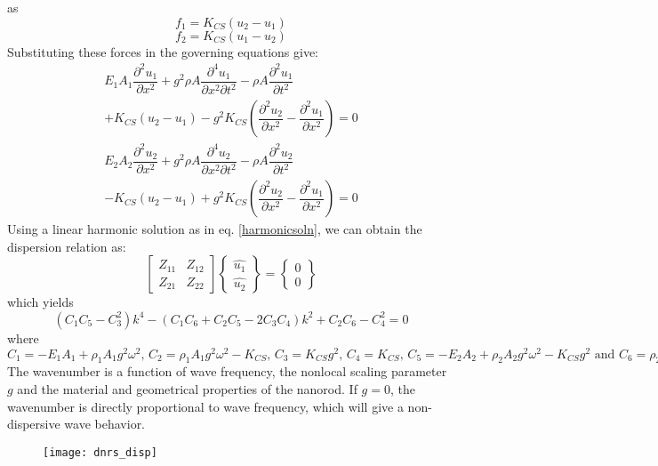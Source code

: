 as\\
\begin{equation}
f_1 = K_{CS} (u_2 - u_1)
\end{equation}
\begin{equation}
f_2 = K_{CS} (u_1 - u_2)
\end{equation}
Substituting these forces in the governing equations give:\\
\begin{multline}
E_1A_1 \dfrac{\partial^2 u_1}{\partial x^2} + g^2 \rho A \dfrac{\partial^4 u_1}{\partial x^2 \partial t^2} - \rho A \dfrac{\partial^2 u_1}{\partial t^2} \\+ K_{CS} (u_2 - u_1) - g^2 K_{CS} \left( \dfrac{\partial^2 u_2}{\partial x^2} - \dfrac{\partial^2 u_1}{\partial x^2}\right) = 0
\end{multline}
\begin{multline}
E_2A_2 \dfrac{\partial^2 u_2}{\partial x^2} + g^2 \rho A \dfrac{\partial^4 u_2}{\partial x^2 \partial t^2} - \rho A \dfrac{\partial^2 u_2}{\partial t^2} \\ - K_{CS} (u_2 - u_1)  + g^2 K_{CS} \left( \dfrac{\partial^2 u_2}{\partial x^2} - \dfrac{\partial^2 u_1}{\partial x^2}\right) = 0 
\end{multline}
Using a linear harmonic solution as in eq. \eqref{harmonicsoln}, we can obtain the dispersion relation as:\\
\[
\begin{bmatrix}
Z_{11} & Z_{12} \\
Z_{21} & Z_{22} 
\end{bmatrix}
\begin{Bmatrix}
\hat{u_1}\\
\hat{u_2}
\end{Bmatrix} = 
\begin{Bmatrix}
0\\
0
\end{Bmatrix}
\]
which yields\\
\begin{equation}
(C_1 C_5 - C_3^2)k^4 - (C_1 C_6 + C_2 C_5 - 2 C_3 C_4) k^2 + C_2 C_6 - C_4^2 = 0
\label{dispeqn}
\end{equation}
where $C_1=-E_1A_1 + \rho_1 A_1 g^2 \omega^2\text{, } C_2=\rho_1 A_1 g^2 \omega^2 - K_{CS} \text{, } C_3=K_{CS} g^2\text{, } C_4 =K_{CS}\text{, }C_5=-E_2 A_2+\rho_2 A_2 g^2 \omega^2 - K_{CS}g^2\text{ and }C_6=\rho_2 A_2 \omega^2-K_{CS}$
The wavenumber is a function of wave frequency, the nonlocal
scaling parameter $g$ and the material and geometrical properties of
the nanorod. If $g = 0$, the wavenumber is directly proportional to
wave frequency, which will give a non-dispersive wave behavior.
\begin{figure}
\centering
\texttt{[image: dnrs\_disp]}
\end{figure}
